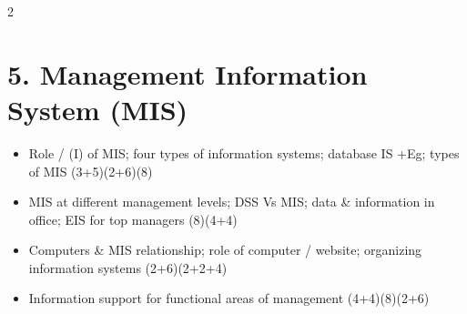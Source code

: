 \documentclass[10pt]{article}
\begin{document}
\begin{multicols}{2}
\section*{5. Management Information System (MIS)}
\begin{itemize}
  \item Role / (I) of MIS; four types of information systems; database IS +Eg; types of MIS \hfill (3+5)(2+6)(8)
  \item MIS at different management levels; DSS Vs MIS; data \& information in office; EIS for top managers \hfill (8)(4+4)
  \item Computers \& MIS relationship; role of computer / website; organizing information systems \hfill (2+6)(2+2+4)
  \item Information support for functional areas of management \hfill (4+4)(8)(2+6)
\end{itemize}

\end{multicols}
\end{document}
